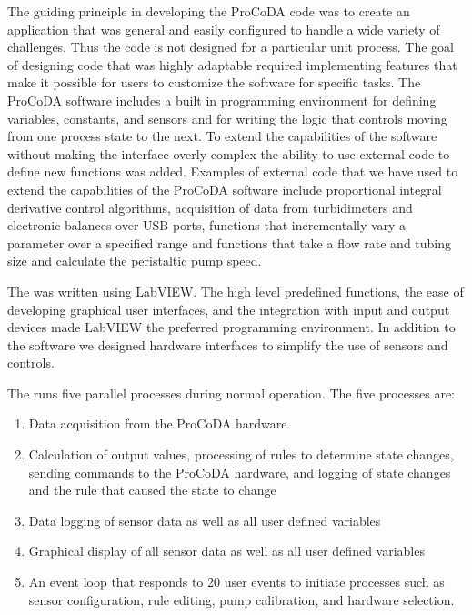 \documentclass[letterpaper,10pt,english]{sphinxmanual}
\begin{document}
The guiding principle in developing the ProCoDA code was to create an application that was general and easily configured to handle a wide variety of challenges. Thus the code is not designed for a particular unit process. The goal of designing code that was highly adaptable required implementing features that make it possible for users to customize the software for specific tasks. The ProCoDA software includes a built in programming environment for defining variables, constants, and sensors and for writing the logic that controls moving from one process state to the next. To extend the capabilities of the software without making the interface overly complex the ability to use external code to define new functions was added. Examples of external code that we have used to extend the capabilities of the ProCoDA software include proportional integral derivative control algorithms, acquisition of data from turbidimeters and electronic balances over USB ports, functions that incrementally vary a parameter over a specified range and functions that take a flow rate and tubing size and calculate the peristaltic pump speed.

The  was written using LabVIEW. The high level predefined functions, the ease of developing graphical user interfaces, and the integration with input and output devices made LabVIEW the preferred programming environment. In addition to the software we designed hardware interfaces to simplify the use of sensors and controls.

The  runs five parallel processes during normal operation. The five processes are:
\begin{enumerate}
\item {} 
Data acquisition from the ProCoDA hardware

\item {} 
Calculation of output values, processing of rules to determine state changes, sending commands to the ProCoDA hardware, and logging of state changes and the rule that caused the state to change

\item {} 
Data logging of sensor data as well as all user defined variables

\item {} 
Graphical display of all sensor data as well as all user defined variables

\item {} 
An event loop that responds to 20 user events to initiate processes such as sensor configuration, rule editing, pump calibration, and hardware selection.

\end{enumerate}
\end{document}
